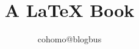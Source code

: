 \documentclass{book}
\begin{document}
\title{A LaTeX Book}
\author{cohomo@blogbus}
\date{}
\maketitle



\end{document}
